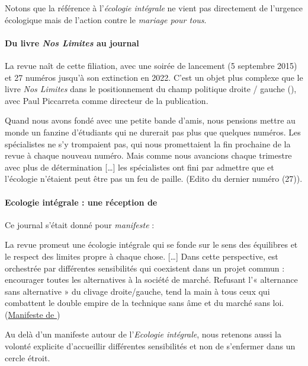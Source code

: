Notons que la référence à l'\textit{écologie intégrale} ne vient pas directement de l'urgence écologique mais de l'action contre le \textit{mariage pour tous}. 





\paragraph{Du livre \textit{Nos Limites} au journal \RLimite} La revue \RLimite   naît de cette filiation, avec une soirée de lancement (5 septembre 2015) et 27 numéros jusqu'à son extinction en 2022. C'est un objet plus complexe que le livre \textit{Nos Limites} dans le positionnement du champ politique droite / gauche (\cite{flipo_limite_2019}), avec Paul Piccarreta comme directeur de la publication.  
\begin{singlequote}
    Quand nous avons fondé \RLimite  avec une petite bande d'amis, nous pensions mettre au monde un fanzine d'étudiants qui ne durerait pas plus que quelques numéros. Les spécialistes ne s'y trompaient pas, qui nous promettaient la fin prochaine de la revue à chaque nouveau numéro. Mais comme nous avancions chaque trimestre avec plus de détermination [\ldots] les spécialistes ont fini par admettre que \RLimite  et l'écologie n'étaient peut être pas un feu de paille. (Edito du dernier numéro (27)). 
\end{singlequote}
 
\paragraph{Ecologie intégrale : une réception de \LS}

 Ce journal s'était donné pour \textit{manifeste} : 
\begin{singlequote}
La revue promeut une écologie intégrale qui se fonde sur le sens des équilibres et le respect des limites propre à chaque chose.
[\ldots]
Dans cette perspective, \RLimite  est orchestrée par différentes sensibilités qui coexistent dans un projet commun : encourager toutes les alternatives à la société de marché. Refusant l’« alternance sans alternative » du clivage droite/gauche, \RLimite  tend la main à tous ceux qui combattent le double empire de la technique sans âme et du marché sans loi. (\href{https://revuelimite.fr/notre-manifeste}{Manifeste de \RLimite})
\end{singlequote}
Au delà d'un manifeste autour de l'\textit{Ecologie intégrale}, nous retenons aussi la volonté explicite d'accueillir différentes sensibilités et non de s'enfermer dans un cercle étroit.


